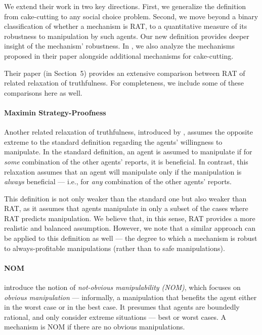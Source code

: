 We extend their work in two key directions.
First, we generalize the definition from cake-cutting to any social choice problem. 
Second, we move beyond a binary classification of whether a mechanism is RAT, to a quantitative measure of its robustness to manipulation by such agents. Our new definition provides deeper insight of the mechanism' robustness.
%
In , we also analyze the mechanisms proposed in their paper alongside additional mechanisms for cake-cutting.

Their paper (in Section~5) provides an extensive comparison between RAT of related relaxation of truthfulness. For completeness, we include some of these comparisons here as well.


\paragraph{Maximin Strategy-Proofness}
Another related relaxation of truthfulness, introduced by \citet{brams2006better}, assumes the opposite extreme to the standard definition regarding the agents' willingness to manipulate. In the standard definition, an agent is assumed to manipulate if for \emph{some} combination of the other agents' reports, it is beneficial. In contrast, this relaxation assumes that an agent will manipulate only if the manipulation is \emph{always} beneficial — i.e., for \emph{any} combination of the other agents' reports. 

This definition is not only weaker than the standard one but also weaker than RAT, as it assumes that agents manipulate in only a subset of the cases where RAT predicts manipulation. 
We believe that, in this sense, RAT provides a more realistic and balanced assumption.
However, we note that a similar approach can be applied to this definition as well — the degree to which a mechanism is robust to always-profitable manipulations (rather than to safe manipulations).


\paragraph{NOM} 
\citet{troyan2020obvious} introduce the notion of \emph{not-obvious manipulability (NOM)}, which focuses on \emph{obvious manipulation} — informally, a manipulation that benefits the agent either in the worst case or in the best case. It presumes that agents are boundedly rational, and only consider extreme situations --- best or worst cases. A mechanism is NOM if there are no obvious manipulations. %

